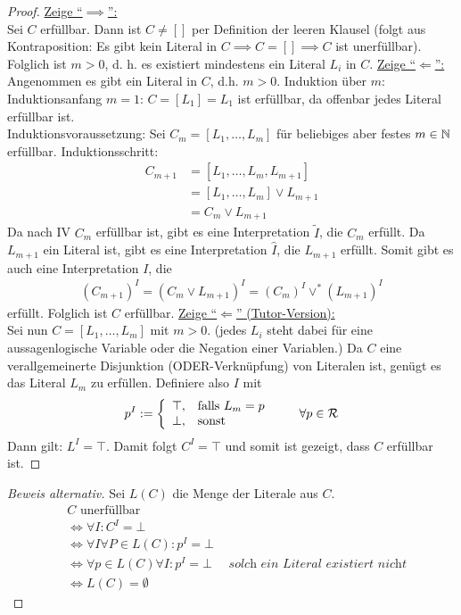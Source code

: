 \begin{proof}
	\underline{Zeige ``$\implies$'':}\\
	Sei $C$ erfüllbar. 
	Dann ist $C\neq[]$ per Definition der leeren Klausel 
	(folgt aus Kontraposition: Es gibt kein Literal in $C\implies C=[]\implies C$ ist unerfüllbar). 	
	Folglich ist $m>0$, d. h. es existiert mindestens ein Literal $L_i$ in $C$.\nl
	\underline{Zeige ``$\Longleftarrow$'':}\\
	Angenommen es gibt ein Literal in $C$, d.h. $m>0$.
	Induktion über $m$:\\
	Induktionsanfang $m=1$: $C=[L_1]=L_1$ ist erfüllbar, da offenbar jedes Literal erfüllbar ist.\\
	Induktionsvoraussetzung: Sei $C_m=[L_1,\ldots,L_m]$ für beliebiges aber festes $m\in\mathbb{N}$ erfüllbar.
	Induktionsschritt: 
	\begin{align*}
		C_{m+1}
		&=[L_1,\ldots,L_m,L_{m+1}]\\
		&=[L_1,\ldots,L_m]\vee L_{m+1}\\
		&= C_{m}\vee L_{m+1}
	\end{align*}
	Da nach IV $C_m$ erfüllbar ist, gibt es eine Interpretation $\tilde{I}$, die $C_m$ erfüllt. 
	Da $L_{m+1}$ ein Literal ist, gibt es eine Interpretation $\hat{I}$, die $L_{m+1}$ erfüllt. 
	Somit gibt es auch eine Interpretation $I$, die 
	\begin{align*}
		(C_{m+1})^I=(C_{m}\vee L_{m+1})^I=(C_{m})^I\vee^\ast (L_{m+1})^I
	\end{align*}
	erfüllt. Folglich ist $C$ erfüllbar.\nl
	\underline{Zeige ``$\Longleftarrow$'' (Tutor-Version):}\\
	Sei nun $C=[L_1,\ldots,L_m]$ mit $m>0$. 
	(jedes $L_i$ steht dabei für eine aussagenlogische Variable oder die Negation einer Variablen.)
	Da $C$ eine verallgemeinerte Disjunktion (ODER-Verknüpfung) von Literalen ist, genügt es das Literal $L_m$ zu erfüllen. 
	Definiere also $I$ mit
	\begin{align*}
		p^I:=\left\lbrace\begin{array}{cl}
			\top,&\text{falls } L_m=p\\		
			\bot,&\text{sonst }
		\end{array}\right.\qquad\forall p\in\mathcal{R}
	\end{align*}
	Dann gilt: $L^I=\top$. Damit folgt $C^I=\top$ und somit ist gezeigt, dass $C$ erfüllbar ist.
\end{proof}
\begin{proof}[Beweis alternativ]
	Sei $L(C)$ die Menge der Literale aus $C$.
	\begin{align*}
		& C \text{ unerfüllbar}\\
		& \iff \forall I : C^I = \bot\\
		& \iff \forall I \forall P \in L(C): p^I = \bot\\
		& \iff \forall p \in L(C) \forall I : p^I = \bot \quad \textit{ solch ein Literal existiert nicht}\\
		& \iff L(C) = \emptyset
	\end{align*}
\end{proof}

